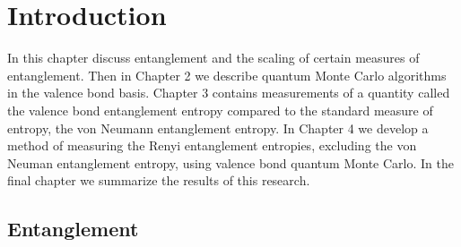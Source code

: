 \chapter{Introduction}




In this chapter discuss entanglement and the scaling of certain measures of entanglement.
Then in Chapter 2 we describe quantum Monte Carlo algorithms in the valence bond basis.
Chapter 3 contains measurements of a quantity called the valence bond entanglement entropy compared to the standard measure of entropy, the von Neumann entanglement entropy.
In Chapter 4 we develop a method of measuring the Renyi entanglement entropies, excluding the von Neuman entanglement entropy, using valence bond quantum Monte Carlo.
In the final chapter we summarize the results of this research.

\section{Entanglement}

